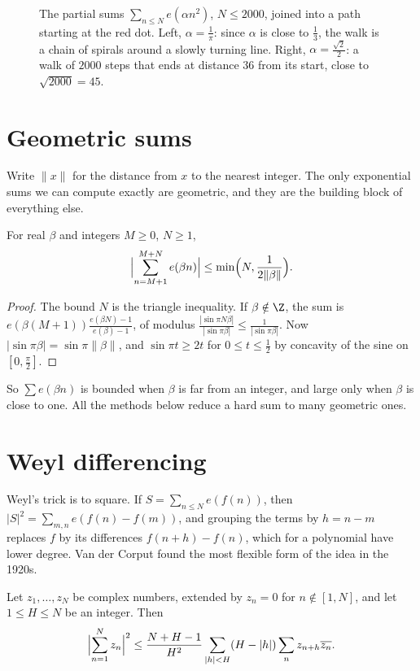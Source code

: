 \begin{figure}[ht]
\centering
{}
\caption{The partial sums $\sum_{n\le N}e(\alpha n^2)$, $N\le2000$, joined into a path starting at the red dot. Left, $\alpha=\frac1\pi$: since $\alpha$ is close to $\frac13$, the walk is a chain of spirals
around a slowly turning line. Right, $\alpha=\frac{\sqrt2}2$: a walk of $2000$ steps that ends at distance $36$ from its start, close to $\sqrt{2000}=45$.}
\label{fig:curlicue}
\end{figure}

\section{Geometric sums}

Write $\|x\|$ for the distance from $x$ to the nearest integer. The only exponential sums we can compute exactly are geometric, and they are the building block of everything else.

\begin{lemma}\label{lem:geom}
For real $\beta$ and integers $M\ge0$, $N\ge1$,
\[
\Bigl|\sum_{n=M+1}^{M+N}e(\beta n)\Bigr|\le\min\Bigl(N,\frac1{2\|\beta\|}\Bigr).
\]
\end{lemma}

\begin{proof}
The bound $N$ is the triangle inequality. If $\beta\notin\Z$, the sum is $e(\beta(M+1))\frac{e(\beta N)-1}{e(\beta)-1}$, of modulus $\frac{|\sin\pi N\beta|}{|\sin\pi\beta|}\le\frac1{|\sin\pi\beta|}$. Now $|\sin\pi\beta|=\sin\pi\|\beta\|$,
and $\sin\pi t\ge2t$ for $0\le t\le\frac12$ by concavity of the sine on $[0,\frac\pi2]$.
\end{proof}

So $\sum e(\beta n)$ is bounded when $\beta$ is far from an integer, and large only when $\beta$ is close to one. All the methods below reduce a hard sum to many geometric ones.

\section{Weyl differencing}

Weyl's trick is to square. If $S=\sum_{n\le N}e(f(n))$, then $|S|^2=\sum_{m,n}e(f(n)-f(m))$, and grouping the terms by $h=n-m$ replaces $f$ by its differences $f(n+h)-f(n)$, which for a polynomial
have lower degree. Van der Corput found the most flexible form of the idea in the 1920s.

\begin{lemma}\label{lem:vdc}
Let $z_1,\dots,z_N$ be complex numbers, extended by $z_n=0$ for $n\notin[1,N]$, and let $1\le H\le N$ be an integer. Then
\[
\Bigl|\sum_{n=1}^Nz_n\Bigr|^2\le\frac{N+H-1}{H^2}\sum_{|h|<H}(H-|h|)\sum_nz_{n+h}\overline{z_n}.
\]
\end{lemma}

